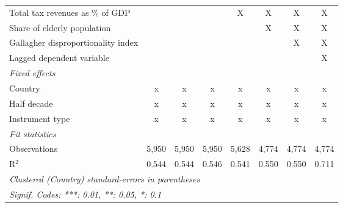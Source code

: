 \begin{table}[htbp]
\begin{tabular}{lccccccc}
      Total tax revenues as \% of GDP                                                           &         &         &              & X       & X       & X       & X\\  
      Share of elderly population                                                               &         &         &              &         & X       & X       & X\\  
      Gallagher disproportionality index                                                        &         &         &              &         &         & X       & X\\  
      Lagged dependent variable                                                                 &         &         &              &         &         &         & X\\  
      \emph{Fixed effects}\\
      Country                                                                                   & x       & x       & x            & x       & x       & x       & x\\  
      Half decade                                                                               & x       & x       & x            & x       & x       & x       & x\\  
      Instrument type                                                                           & x       & x       & x            & x       & x       & x       & x\\  
      \midrule \emph{Fit statistics}\\
      Observations                                                                              & 5,950   & 5,950   & 5,950        & 5,628   & 4,774   & 4,774   & 4,774\\  
      R$^2$                                                                                     & 0.544   & 0.544   & 0.546        & 0.541   & 0.550   & 0.550   & 0.711\\  
      \midrule
      \multicolumn{8}{l}{\emph{Clustered (Country) standard-errors in parentheses}}\\
      \multicolumn{8}{l}{\emph{Signif. Codes: ***: 0.01, **: 0.05, *: 0.1}}\\
   \end{tabular}
\end{table}


